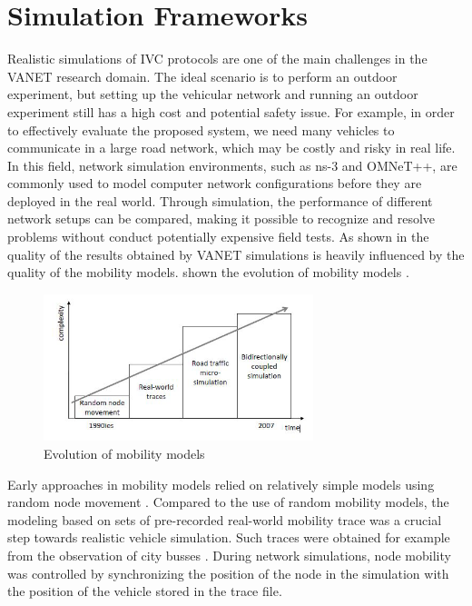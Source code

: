 \chapter{Simulation Frameworks}
\label{cha:frame}
Realistic simulations of IVC protocols are one of the main challenges in the VANET research domain. The ideal scenario is to perform an outdoor experiment, but setting up the vehicular network and running an outdoor experiment still has a high cost and potential safety issue. For example, in order to effectively evaluate the proposed system, we need many vehicles to communicate in a large road network, which may be costly and risky in real life.\\ In this field, network simulation environments, such as ns-3 and OMNeT++, are commonly used to model computer network configurations before they are deployed in the real world. Through simulation, the performance of different network setups can be compared, making it possible to recognize and resolve problems without conduct potentially expensive field tests.
As shown in \cite{mahajan2006urban} the quality of the results obtained by VANET simulations is heavily influenced by the quality of the mobility models.
 shown the evolution of mobility models \cite{sommer2008progressing}.
\begin{figure}[H]
    \centering
    \includegraphics[width=0.7\textwidth]{fig/mobility.png}
    \caption{Evolution of mobility models}
    \label{fig:mob}
\end{figure}
Early approaches in mobility models relied on relatively simple models using random node movement \cite{johnson1996dynamic}.
Compared to the use of random mobility models, the modeling based on sets of pre-recorded real-world mobility trace was a crucial step towards realistic vehicle simulation. Such traces were obtained for example from the observation of city busses \cite{jetcheva2003design}. During network simulations, node mobility was controlled by synchronizing the position of the node in the simulation with the position of the vehicle stored in the trace file. \\
